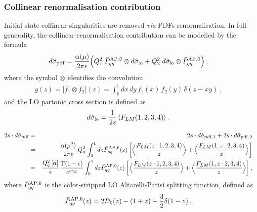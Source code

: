 \documentclass[12pt,a4paper]{article}
\newcommand{\nn}{\nonumber}
\newcommand{\eps}{\epsilon}
\newcommand{\beq}{\begin{eqnarray}}
\newcommand{\eeq}{\end{eqnarray}}
\begin{document}
\subsubsection{Collinear renormalisation contribution}
Initial state collinear singularities are removed {\it via} PDFs renormalisation.
In full generality, the collinear-renormalisation contribution can be modelled by the formula
\beq\label{pdfrenorm}
d \hat{\sigma}_{\rm pdf} = \frac{\alpha(\mu)}{2\pi \epsilon}
\Big(
Q_1^2 \; 
 \bar{P}_{qq}^{\rm AP, 0}
 \otimes
 d\hat{\sigma}_{\rm lo}
 +
 Q_2^2 \; 
 d\hat{\sigma}_{\rm lo}
  \otimes
  \bar{P}_{qq}^{\rm AP, 0}
\Big) \, ,
\eeq
where the symbol $\otimes$ identifies the convolution
\beq
g(z) = 
\big[
f_1 \otimes f_2
\big] (z)
=
\int_0^1
dx \, dy \, 
f_1(x) \, f_2(y) \, \delta(z-x y) \, , 
\label{eq:convolution}
\eeq
and the LO partonic cross section is defined as 
\beq
d\hat{\sigma}_{\rm lo} = \frac1{2s} \, \langle F_{LM}(1,2,3,4) \rangle \; .
\eeq

\beq
2s \cdot d\hat{\sigma}_{\rm pdf} &=&
 2s \cdot d\hat{\sigma}_{\rm pdf, 1}+2s \cdot d\hat{\sigma}_{\rm pdf, 2} 
 \nn \\
 &=&
\frac{\alpha(\mu^{2})}{2\pi \eps} \, 
Q_q^2 \,  \int_{0}^{1}dz
 \bar{P}_{qq}^{\rm AP, 0} (z) \, \bigg[
\Big\langle \frac{F_{LM}(z \cdot 1, 2,3,4)}{z} \Big\rangle
+
\Big\langle \frac{F_{LM}(1, z \cdot  2,3,4)}{z} \Big\rangle
 \bigg]
\\  \nn 
 &=&
\frac{Q_q^2 \,   [\alpha]}{\eps} \, 
\frac{\Gamma(1-\eps)}{e^{\eps \gamma_E}}
\int_{0}^{1}dz
 \bar{P}_{qq}^{\rm AP, 0} (z) \, \bigg[
\Big\langle \frac{F_{LM}(z \cdot 1, 2,3,4)}{z} \Big\rangle
+
\Big\langle \frac{F_{LM}(1, z \cdot  2,3,4)}{z} \Big\rangle
 \bigg]
  \, ,
  \eeq
 where $\bar{P}_{qq}^{\rm AP, 0}$ is the color-stripped LO Altarelli-Parisi splitting function, defined as
 \beq
  \bar{P}_{qq}^{\rm AP, 0}(z)
  = 
  2 \mathcal{D}_0 (z) -(1+z) +\frac32 \delta(1-z) \, .
  \label{eq:PqqAP0}
 \eeq
 
 
\end{document}
